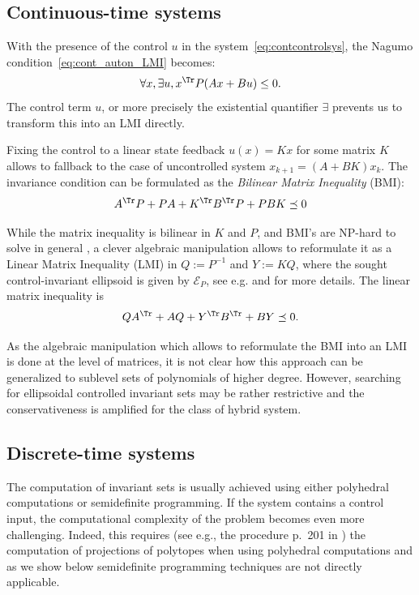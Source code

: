 \documentclass[11pt,twoside,a4paper,openright]{uclouvain-thesis}
\begin{document}
\subsection{Continuous-time systems}

With the presence of the control $u$ in the system~\eqref{eq:contcontrolsys},
the Nagumo condition~\eqref{eq:cont_auton_LMI} becomes:
\begin{equation}
  \label{eq:cont_existential}
  \forall x, \exists u, x^\Tr P(Ax + Bu) \leq 0.
\end{equation}
The control term $u$, or more precisely the existential quantifier $\exists$ prevents
us to transform this into an LMI directly.

Fixing the control to a linear state feedback $u(x) = Kx$ for some matrix $K$ allows
to fallback to the case of uncontrolled system $x_{k+1} = (A + BK) x_k$.
The invariance condition can be formulated
as the \emph{Bilinear Matrix Inequality} (BMI):
\[ A^\Tr P + PA + K^\Tr B^\Tr P + PBK \preceq 0 \]

While the matrix inequality is bilinear in $K$ and $P$, and BMI's are NP-hard to solve in general \cite{toker1995np},
a clever algebraic manipulation
allows to reformulate it as a
Linear Matrix Inequality (LMI) in $Q := P^{-1}$ and $Y := KQ$,
where the sought control-invariant ellipsoid is given by $\mathcal{E}_P$,
see e.g. \cite[Section~7.2.1, Section~7.2.2]{boyd1994linear} and \cite[Section~4.4.1]{blanchini2015set} for more details.
The linear matrix inequality is
\begin{equation}
  \label{eq:cont_control_LMI}
  QA^\Tr + AQ + Y^\Tr B^\Tr  + BY \preceq 0.
\end{equation}

As the algebraic manipulation which allows to reformulate the BMI into
an LMI is done at the level of matrices, it is not clear how this
approach can be generalized to sublevel sets of polynomials of higher degree.
However, searching for ellipsoidal controlled invariant sets may be rather
restrictive and the conservativeness is amplified for the class of hybrid system.


\subsection{Discrete-time systems}

The computation of invariant sets is usually achieved using either polyhedral
computations or semidefinite programming.
If the system contains a control input, the computational complexity of the
problem becomes even more challenging.
Indeed, this requires (see e.g., the procedure p.~201 in \cite{blanchini2015set})
the computation of projections of polytopes when using polyhedral computations
and as we show below semidefinite programming techniques are not directly applicable.
\end{document}
